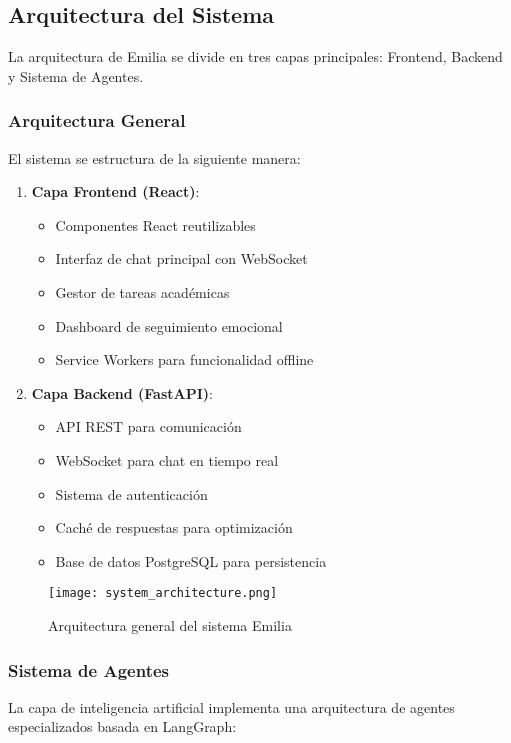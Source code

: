 \documentclass[conference]{IEEEtran}
\begin{document}
\subsection{Arquitectura del Sistema}
La arquitectura de Emilia se divide en tres capas principales: Frontend, Backend y Sistema de Agentes.

\subsubsection{Arquitectura General}
El sistema se estructura de la siguiente manera:

\begin{enumerate}
\item \textbf{Capa Frontend (React)}:
    \begin{itemize}
    \item Componentes React reutilizables
    \item Interfaz de chat principal con WebSocket
    \item Gestor de tareas académicas
    \item Dashboard de seguimiento emocional
    \item Service Workers para funcionalidad offline
    \end{itemize}

\item \textbf{Capa Backend (FastAPI)}:
    \begin{itemize}
    \item API REST para comunicación
    \item WebSocket para chat en tiempo real
    \item Sistema de autenticación
    \item Caché de respuestas para optimización
    \item Base de datos PostgreSQL para persistencia
    \end{itemize}
\end{enumerate}

\begin{figure}[h]
\centering
\texttt{[image: system\_architecture.png]}
\caption{Arquitectura general del sistema Emilia}
\label{fig:system_architecture}
\end{figure}

\subsubsection{Sistema de Agentes}
La capa de inteligencia artificial implementa una arquitectura de agentes especializados basada en LangGraph:
\end{document}
